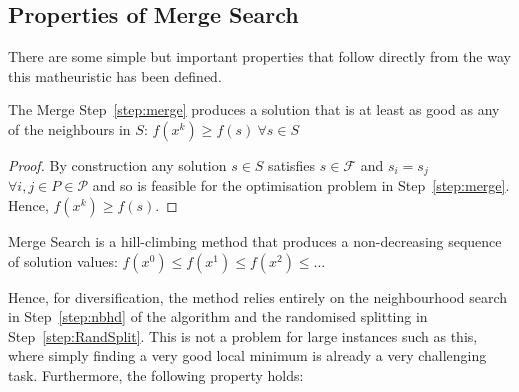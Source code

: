 \documentclass[journal]{IEEEtran}
\begin{document}
\subsection{Properties of Merge Search}
There are some simple but important properties that follow directly from the way this matheuristic has been defined.

\begin{lemma}\label{thm:improve}
  The Merge Step~\ref{step:merge} produces a solution that is at least as good
  as any of the neighbours in $S$: $f(x^k) \ge f(s)\ \forall s\in S$
\end{lemma}
\begin{proof}
  By construction any solution $s\in S$ satisfies $s\in \mathcal{F}$ and
  $s_i=s_j$ $\forall i,j\in P\in\mathcal{P}$ and so is feasible for the
  optimisation problem in Step~\ref{step:merge}. Hence, $f(x^k)\ge f(s)$.
\end{proof}

\begin{corollary}\label{thm:hill-climb}
  Merge Search is a hill-climbing method that produces a non-decreasing sequence
 of solution values: $f(x^0)\le f(x^1)\le f(x^2)\le \ldots$
\end{corollary}

Hence, for diversification, the method relies entirely on the neighbourhood
search in Step~\ref{step:nbhd} of the algorithm and the randomised splitting in
Step~\ref{step:RandSplit}. This is not a problem for large instances such as
this, where simply finding a very good local minimum is already a very
challenging task. Furthermore, the following property holds:
\end{document}
